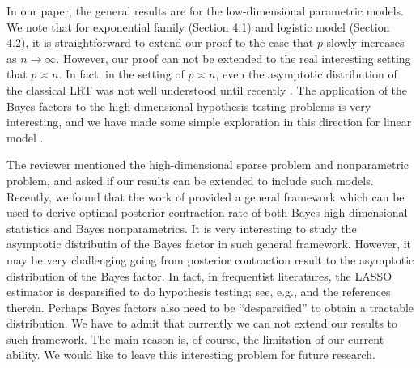 \documentclass[11pt]{article}
\theoremstyle{plain}
\theoremstyle{definition}
\theoremstyle{remark}
\begin{document}
In our paper, the general results are for the low-dimensional parametric models.
We note that for exponential family (Section 4.1) and logistic model (Section 4.2), it is straightforward to extend our proof to the case that $p$ slowly increases as $n \to \infty$.
However, our proof can not be extended to the real interesting setting that $p\asymp n$.
In fact, in the setting of $p \asymp n$, even the asymptotic distribution of the classical LRT was not well understood until recently \cite{Sur2019A,Sur2019The}.
The application of the Bayes factors to the high-dimensional hypothesis testing problems is very interesting, 
and we have made some simple exploration in this direction for linear model \cite{Wang2020}.

The reviewer mentioned the high-dimensional sparse problem and nonparametric problem, and asked if our results can be extended to include such models.
Recently, we found that the work of \cite{Gao2020A} provided a general framework which can be used to derive optimal posterior contraction rate of both Bayes high-dimensional statistics and Bayes nonparametrics.
It is very interesting to study the asymptotic distributin of the Bayes factor in such general framework.
However, it may be very challenging going from posterior contraction result to the asymptotic distribution of the Bayes factor.
In fact, in frequentist literatures, the LASSO estimator is desparsified to do hypothesis testing; see, e.g., \cite{ZC2017} and the references therein.
Perhaps Bayes factors also need to be ``desparsified'' to obtain a tractable distribution.
We have to admit that currently we can not extend our results to such framework.
The main reason is, of course, the limitation of our current ability.
We would like to leave this interesting problem for future research.



%
%
\end{document}

